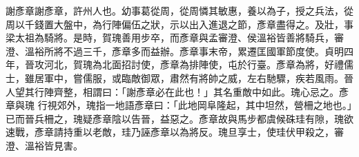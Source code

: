 \begin{pinyinscope}
 謝彥章謝彥章，許州人也。幼事葛從周，從周憐其敏惠，養以為子，授之兵法，從周以千錢置大盤中，為行陣偏伍之狀，示以出入進退之節，彥章盡得之。及壯，事梁太祖為騎將。是時，賀瑰善用步卒，而彥章與孟審澄、侯溫裕皆善將騎兵，審澄、溫裕所將不過三千，彥章多而益辦。彥章事末帝，累遷匡國軍節度使。貞明四年，晉攻河北，賀瑰為北面招討使，彥章為排陣使，屯於行臺。彥章為將，好禮儒士，雖居軍中，嘗儒服，或臨敵御眾，肅然有將帥之威，左右馳驟，疾若風雨。晉人望其行陣齊整，相謂曰：「謝彥章必在此也！」其名重敵中如此。瑰心忌之。彥章與瑰
 行視郊外，瑰指一地語彥章曰：「此地岡阜隆起，其中坦然，營柵之地也。」已而晉兵柵之，瑰疑彥章陰以告晉，益惡之。彥章故與馬步都虞候硃珪有隙，瑰欲速戰，彥章請持重以老敵，珪乃誣彥章以為將反。瑰旦享士，使珪伏甲殺之，審澄、溫裕皆見害。



\end{pinyinscope}